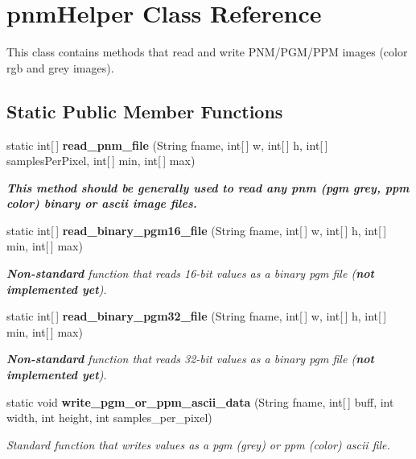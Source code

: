 \section{pnm\-Helper Class Reference}
\label{class_c_s_image_viewer_1_1pnm_helper}
This class contains methods that read and write PNM/PGM/PPM images (color rgb and grey images).  


\subsection*{Static Public Member Functions}
\begin{CompactItemize}
\item 
static int[$\,$] {\bf read\_\-pnm\_\-file} (String fname, int[$\,$] w, int[$\,$] h, int[$\,$] samples\-Per\-Pixel, int[$\,$] min, int[$\,$] max)
\begin{CompactList}\small\item\em {\bf  This method should be generally used to read any pnm (pgm grey, ppm color) binary or ascii image files. } \item\end{CompactList}\item 
static int[$\,$] {\bf read\_\-binary\_\-pgm16\_\-file} (String fname, int[$\,$] w, int[$\,$] h, int[$\,$] min, int[$\,$] max)
\begin{CompactList}\small\item\em {\bf Non-standard} function that reads 16-bit values as a binary pgm file ({\bf not implemented yet}). \item\end{CompactList}\item 
static int[$\,$] {\bf read\_\-binary\_\-pgm32\_\-file} (String fname, int[$\,$] w, int[$\,$] h, int[$\,$] min, int[$\,$] max)
\begin{CompactList}\small\item\em {\bf Non-standard} function that reads 32-bit values as a binary pgm file ({\bf not implemented yet}). \item\end{CompactList}\item 
static void {\bf write\_\-pgm\_\-or\_\-ppm\_\-ascii\_\-data} (String fname, int[$\,$] buff, int width, int height, int samples\_\-per\_\-pixel)
\begin{CompactList}\small\item\em Standard function that writes values as a pgm (grey) or ppm (color) ascii file. \item\end{CompactList}\item 

\end{CompactItemize}
